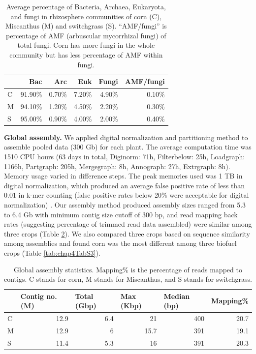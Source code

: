 \documentclass[]{msu-thesis}
\begin{document}
\begin{table}[htbp]
  \centering
  \caption[Domain level distribution in rhizosphere communities]{Average percentage of Bacteria, Archaea, Eukaryota, and fungi in rhizosphere communities of corn (C), Miscanthus (M) and switchgrass (S).  “AMF/fungi” is percentage of AMF (arbuscular mycorrhizal  fungi) of total fungi.  Corn has more fungi in the whole community but has less percentage of AMF within fungi.}
    \begin{tabular}{|lrrrrr|}
    \toprule
          & Bac   & Arc   & Euk   & Fungi & AMF/fungi \\
    \midrule
    C     & 91.90\% & 0.70\% & 7.20\% & 4.90\% & 0.10\% \\
    M     & 94.10\% & 1.20\% & 4.50\% & 2.20\% & 0.30\% \\
    S     & 95.00\% & 0.90\% & 4.00\% & 2.00\% & 0.40\% \\
    \bottomrule
    \end{tabular}%
  \label{tab:chap4TabS5}%
\end{table}%




\textbf{Global assembly. }
We applied digital normalization and partitioning method \cite{howe_tackling_2014} to assemble pooled data (300 Gb) for each plant. The average computation time was 1510 CPU hours (63 days in total, Diginorm: 71h, Filterbelow: 25h, Loadgraph: 1166h, Partgraph: 205h, Mergegraph: 8h, Annograph: 27h, Extrgraph: 8h). Memory usage varied in difference steps. The peak memories used was 1 TB in digital normalization, which produced an average false positive rate of less than 0.01 in k-mer counting (false positive rates below 20\% were acceptable for digital normalization) \cite{zhang_these_2014}. Our assembly method produced assembly sizes ranged from 5.3 to 6.4 Gb with minimum contig size cutoff of 300 bp, and read mapping back rates (suggesting percentage of trimmed read data assembled) were similar among three crops (Table \ref{tab:chap4TabS4}). We also compared three crops based on sequence similarity among assemblies and found corn was the most different among three biofuel crops (Table \ref{tab:chap4TabS3}).

\begin{table}[htbp]
  \centering
  \caption[Global assembly statistics]{Global assembly statistics. Mapping\% is the percentage of reads mapped to contigs. C stands for corn, M stands for Miscanthus, and S stands for switchgrass.}
    \begin{tabular}{|lrrrrr|}
    \toprule
          & \multicolumn{1}{l}{Contig no. (M)} & \multicolumn{1}{l}{Total (Gbp)} & \multicolumn{1}{l}{Max (Kbp)} & \multicolumn{1}{l}{Median (bp)} & \multicolumn{1}{l|}{Mapping\%} \\
    \midrule
    C     & 12.9  & 6.4   & 21    & 400   & 20.7 \\
    M     & 12.9  & 6     & 15.7  & 391   & 19.1 \\
    S     & 11.4  & 5.3   & 16    & 391   & 20.3 \\
    \bottomrule
    \end{tabular}%
  \label{tab:chap4TabS4}%
\end{table}%
\end{document}
